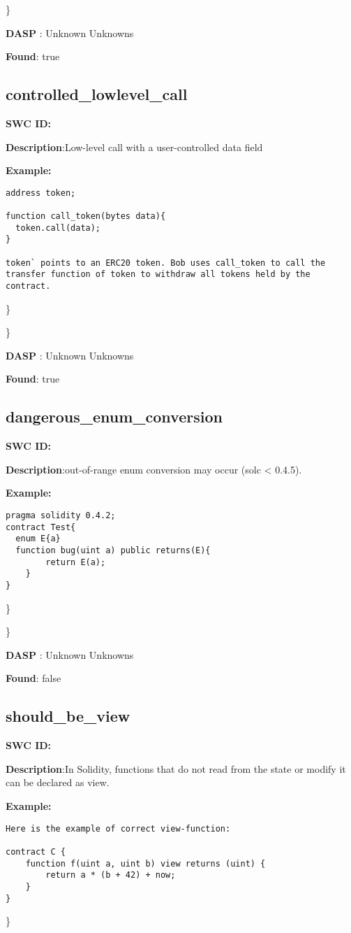 \documentclass{article}
\begin{document}
\} 

\textbf{DASP} : Unknown Unknowns

\textbf{Found}: true

\subsection{controlled\_lowlevel\_call} 
\textbf{SWC \textunderscore ID:} 

\textbf{Description}:Low-level call with a user-controlled data field


\textbf{Example:} 
\begin{verbatim}
address token;

function call_token(bytes data){
  token.call(data);
}

token` points to an ERC20 token. Bob uses call_token to call the transfer function of token to withdraw all tokens held by the contract.

\end{verbatim}\} 

\} 

\textbf{DASP} : Unknown Unknowns

\textbf{Found}: true

\subsection{dangerous\_enum\_conversion} 
\textbf{SWC \textunderscore ID:} 

\textbf{Description}:out-of-range enum conversion may occur (solc < 0.4.5).


\textbf{Example:} 
\begin{verbatim}
pragma solidity 0.4.2;
contract Test{
  enum E{a}
  function bug(uint a) public returns(E){
        return E(a);
    }
}

\end{verbatim}\} 

\} 

\textbf{DASP} : Unknown Unknowns

\textbf{Found}: false

\subsection{should\_be\_view} 
\textbf{SWC \textunderscore ID:} 

\textbf{Description}:In Solidity, functions that do not read from the state or modify it can be declared as view.


\textbf{Example:} 
\begin{verbatim}
Here is the example of correct view-function:

contract C {
    function f(uint a, uint b) view returns (uint) {
        return a * (b + 42) + now;
    }
}

\end{verbatim}\} 
\end{document}
